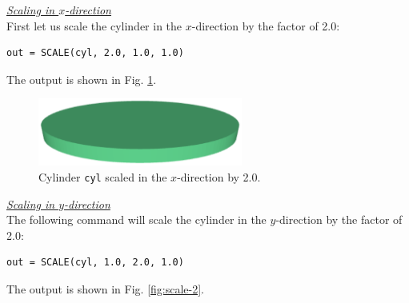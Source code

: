 \noindent
\underline{\em Scaling in $x$-direction}\\

First let us scale the cylinder in the $x$-direction by the factor of 2.0: \\

\begin{bbox}
\begin{verbatim}
out = SCALE(cyl, 2.0, 1.0, 1.0)
\end{verbatim}
\end{bbox}
\vspace{6mm}

\noindent
\newpage
\noindent
The output is shown in Fig. \ref{fig:scale-1}.

\begin{figure}[!ht]
\begin{center}
\includegraphics[width=0.6\textwidth]{img/scale-1.png}
\end{center}
\vspace{-4mm}
\caption{Cylinder {\tt cyl} scaled in the $x$-direction by 2.0.}
\label{fig:scale-1}
\end{figure}

\noindent
\underline{\em Scaling in $y$-direction}\\

The following command will 
scale the cylinder in the $y$-direction by the factor of 2.0: \\

\begin{bbox}
\begin{verbatim}
out = SCALE(cyl, 1.0, 2.0, 1.0)
\end{verbatim}
\end{bbox}
\vspace{6mm}

\noindent
The output is shown in Fig. \ref{fig:scale-2}.


